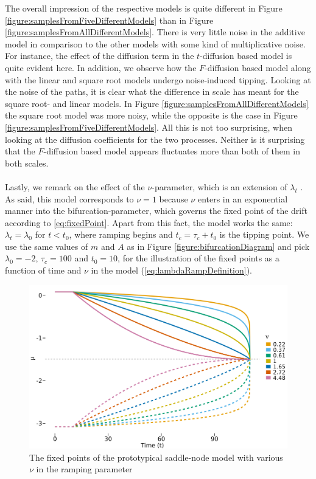 The overall impression of the respective models is quite different in Figure \ref{figure:samplesFromFiveDifferentModels} than in Figure \ref{figure:samplesFromAllDifferentModels}. There is very little noise in the additive model in comparison to the other models with some kind of multiplicative noise. For instance, the effect of the diffusion term in the $t$-diffusion based model is quite evident here. In addition, we observe how the $F$-diffusion based model along with the linear and square root models undergo noise-induced tipping. Looking at the noise of the paths, it is clear what the difference in scale has meant for the square root- and linear models. In Figure \ref{figure:samplesFromAllDifferentModels} the square root model was more noisy, while the opposite is the case in Figure \ref{figure:samplesFromFiveDifferentModels}. All this is not too surprising, when looking at the diffusion coefficients for the two processes. Neither is it surprising that the $F$-diffusion based model appears fluctuates more than both of them in both scales.\\\\
Lastly, we remark on the effect of the $\nu$-parameter, which is an extension of $\lambda_t$ \cite[equation (2)]{Ditlevsen2023}. As said, this model corresponds to $\nu = 1$ because $\nu$ enters in an exponential manner into the bifurcation-parameter, which governs the fixed point of the drift according to \ref{eq:fixedPoint}. Apart from this fact, the model works the same: $\lambda_t = \lambda_0$ for $t<t_0$, where ramping begins and $t_c = \tau_c + t_0$ is the tipping point. We use the same values of $m$ and $A$ as in Figure \ref{figure:bifurcationDiagram} and pick $\lambda_0 = -2$, $\tau_c = 100$ and $t_0 = 10$, for the illustration of the fixed points as a function of time and $\nu$ in the model (\ref{eq:lambdaRampDefinition}).
\begin{figure}[h!]
    \begin{center}
        \includegraphics[scale = .1]{figures/nu_plot.jpeg}
        \caption{The fixed points of the prototypical saddle-node model with various $\nu$ in the ramping parameter}
        \label{figure:nu_plot}    
    \end{center}
\end{figure}\\
